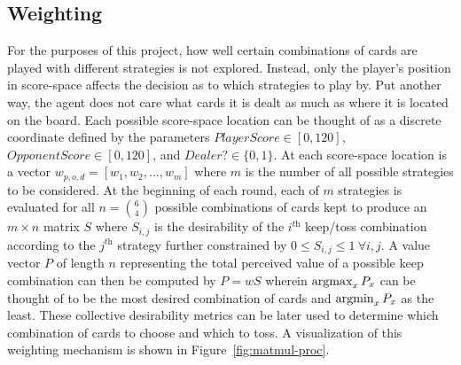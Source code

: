 

\subsection{Weighting}
\label{sec:dm-methods-weighting}



For the purposes of this project,
how well certain combinations of cards are played with different strategies
is not explored.
%
Instead, only the player's position in score-space affects the decision as to
which strategies to play by.
%
Put another way, the agent does not care what cards it is dealt as much as where
it is located on the board.
%
Each possible score-space location can be thought of as a discrete coordinate
defined by the parameters
$\textit{PlayerScore} \in [0, 120]$,
$\textit{OpponentScore} \in [0, 120]$,
and
$\textit{Dealer?} \in \{0,1\}$.
%
At each score-space location is a vector $w_{p,o,d} = [w_1,w_2,\ldots,w_m]$
where $m$ is the number of all possible strategies to be considered.
At the beginning of each round, each of $m$ strategies is evaluated for all
$n = {6 \choose 4}$ possible combinations of cards kept to produce an
$m \times n$ matrix $S$
where $S_{i,j}$ is the desirability of the $i^{\textit{th}}$ keep/toss
combination according to the $j^{\textit{th}}$ strategy
further constrained by
$0 \le S_{i,j} \le 1\ \forall i,j$.
%
A value vector $P$ of length $n$ representing the total perceived value of a
possible keep combination
can then be computed by
$P = w S$
wherein $\operatorname*{argmax}_{x}{P_x}$ can be thought of to be the most desired combination
of cards and $\operatorname*{argmin}_{x}{P_x}$ as the least.
%
These collective desirability metrics can be later used to determine which
combination of cards to choose and which to toss.
%
A visualization of this weighting mechanism is shown in
Figure~\ref{fig:matmul-proc}.




